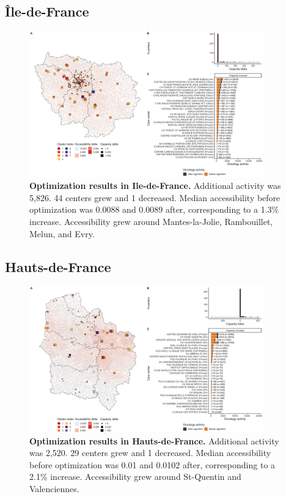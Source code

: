 \subsection*{Île-de-France}

\begin{figure}[H]
    \includegraphics[width=0.9\textwidth]{images/camion/optim_region/optim_Ile-de-France.png}
    \centering
    \caption{ \textbf{Optimization results in Ile-de-France.} Additional
        activity was 5,826. 44 centers grew and 1 decreased. Median
        accessibility before optimization was 0.0088 and 0.0089 after,
        corresponding to a 1.3\% increase. Accessibility grew around
        Mantes-la-Jolie, Rambouillet, Melun, and Evry. }
\end{figure}

\subsection*{Hauts-de-France}

\begin{figure}[H]
    \includegraphics[width=0.9\textwidth]{images/camion/optim_region/optim_Hauts-de-France.png}
    \centering
    \caption{ \textbf{Optimization results in Hauts-de-France.} Additional
        activity was 2,520. 29 centers grew and 1 decreased. Median
        accessibility before optimization was 0.01 and 0.0102 after,
        corresponding to a 2.1\% increase. Accessibility grew around St-Quentin
        and Valenciennes. }
\end{figure}

